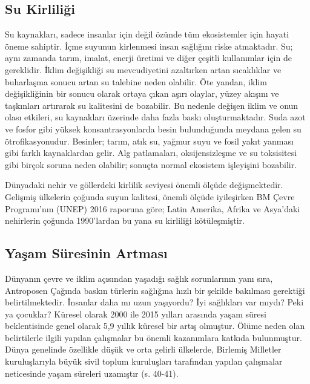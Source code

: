 \documentclass[
]{book}
\begin{document}
\hypertarget{su-kirliliux11fi}{%
\subsection{Su Kirliliği}\label{su-kirliliux11fi}}

Su kaynakları, sadece insanlar için değil özünde tüm ekosistemler için hayati öneme sahiptir. İçme suyunun kirlenmesi insan sağlığını riske atmaktadır. Su; aynı zamanda tarım, imalat, enerji üretimi ve diğer çeşitli kullanımlar için de gereklidir. İklim değişikliği su mevcudiyetini azaltırken artan sıcaklıklar ve buharlaşma sonucu artan su talebine neden olabilir. Öte yandan, iklim değişikliğinin bir sonucu olarak ortaya çıkan aşırı olaylar, yüzey akışını ve taşkınları artırarak su kalitesini de bozabilir. Bu nedenle değişen iklim ve onun olası etkileri, su kaynakları üzerinde daha fazla baskı oluşturmaktadır. Suda azot ve fosfor gibi yüksek konsantrasyonlarda besin bulunduğunda meydana gelen su ötrofikasyonudur. Besinler; tarım, atık su, yağmur suyu ve fosil yakıt yanması gibi farklı kaynaklardan gelir. Alg patlamaları, oksijensizleşme ve su toksisitesi gibi birçok soruna neden olabilir; sonuçta normal ekosistem işleyişini bozabilir. \citep{nazari2018climate}

Dünyadaki nehir ve göllerdeki kirlilik seviyesi önemli ölçüde değişmektedir. Gelişmiş ülkelerin çoğunda suyun kalitesi, önemli ölçüde iyileşirken BM Çevre Programı'nın (UNEP) 2016 raporuna göre; Latin Amerika, Afrika ve Asya'daki nehirlerin çoğunda 1990'lardan bu yana su kirliliği kötüleşmiştir. \citep{unep2016snapshot}

\hypertarget{yaux15fam-suxfcresinin-artmasux131}{%
\subsection{Yaşam Süresinin Artması}\label{yaux15fam-suxfcresinin-artmasux131}}

Dünyanın çevre ve iklim açısından yaşadığı sağlık sorunlarının yanı sıra, Antroposen Çağında baskın türlerin sağlığına hızlı bir şekilde bakılması gerektiği belirtilmektedir. İnsanlar daha mı uzun yaşıyordu? İyi sağlıkları var mıydı? Peki ya çocuklar? Küresel olarak 2000 ile 2015 yılları arasında yaşam süresi beklentisinde genel olarak 5,9 yıllık küresel bir artış olmuştur. Ölüme neden olan belirtilerle ilgili yapılan çalışmalar bu önemli kazanımlara katkıda bulunmuştur. Dünya genelinde özellikle düşük ve orta gelirli ülkelerde, Birlemiş Milletler kuruluşlarıyla büyük sivil toplum kuruluşları tarafından yapılan çalışmalar neticesinde yaşam süreleri uzamıştır (s. 40-41). \citep{bush2020}
\end{document}
